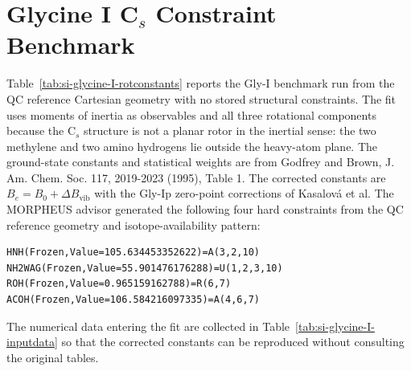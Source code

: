 \documentclass[12pt]{article}
\begin{document}
\section{\texorpdfstring{Glycine I C$_s$ Constraint Benchmark}{Glycine I Cs Constraint Benchmark}}

Table~\ref{tab:si-glycine-I-rotconstants} reports the Gly-I benchmark run from
the QC reference Cartesian geometry with no stored structural constraints. The fit uses
moments of inertia as observables and all three rotational components because
the C$_s$ structure is not a planar rotor in the inertial sense: the two
methylene and two amino hydrogens lie outside the heavy-atom plane. The
ground-state constants and statistical weights are from Godfrey and Brown,
J. Am. Chem. Soc. 117, 2019-2023 (1995), Table 1. The corrected constants are
$B_e=B_0+\Delta B_\mathrm{vib}$ with the Gly-Ip zero-point corrections of
Kasalov{\'a} et al. The MORPHEUS advisor generated the following four hard
constraints from the QC reference geometry and isotope-availability pattern:
\begin{verbatim}
HNH(Frozen,Value=105.634453352622)=A(3,2,10)
NH2WAG(Frozen,Value=55.901476176288)=U(1,2,3,10)
ROH(Frozen,Value=0.965159162788)=R(6,7)
ACOH(Frozen,Value=106.584216097335)=A(4,6,7)
\end{verbatim}
The numerical data entering the fit are collected in
Table~\ref{tab:si-glycine-I-inputdata} so that the corrected constants can be
reproduced without consulting the original tables.
\end{document}
